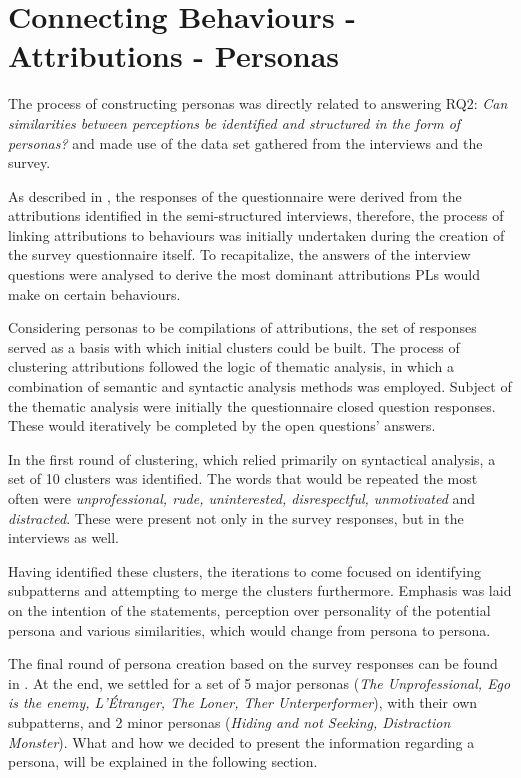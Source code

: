 \section{Connecting Behaviours - Attributions - Personas}

The process of constructing personas was directly related to answering RQ2: \textit{Can similarities between perceptions be identified and structured in the form of personas?} and made use of the data set gathered from the interviews and the survey. 

As described in , the responses of the questionnaire were derived from the attributions identified in the semi-structured interviews, therefore, the process of linking attributions to behaviours was initially undertaken during the creation of the survey questionnaire itself. To recapitalize, the answers of the interview questions were analysed to derive the most dominant attributions PLs would make on certain behaviours. 

Considering personas to be compilations of attributions, the set of responses served as a basis with which initial clusters could be built. The process of clustering attributions followed the logic of thematic analysis, in which a combination of semantic and syntactic analysis methods was employed. Subject of the thematic analysis were initially the questionnaire closed question responses. These would iteratively be completed by the open questions' answers.

In the first round of clustering, which relied primarily on syntactical analysis, a set of 10 clusters was identified. The words that would be repeated the most often were \textit{unprofessional, rude, uninterested, disrespectful, unmotivated} and \textit{distracted}. These were present not only in the survey responses, but in the interviews as well. 

Having identified these clusters, the iterations to come focused on identifying subpatterns and attempting to merge the clusters furthermore. Emphasis was laid on the intention of the statements, perception over personality of the potential persona and various similarities, which would change from persona to persona.

The final round of persona creation based on the survey responses can be found in . At the end, we settled for a set of 5 major personas (\textit{The Unprofessional, Ego is the enemy, L'Étranger, The Loner, Ther Unterperformer}), with their own subpatterns, and 2 minor personas (\textit{Hiding and not Seeking, Distraction Monster}). What and how we decided to present the information regarding a persona, will be explained in the following section.

